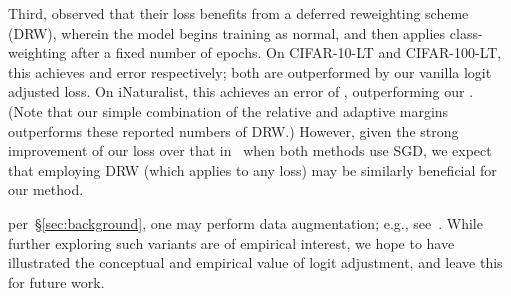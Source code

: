 {{Third,}
\citet{Cao:2019} observed that their loss benefits from a deferred reweighting scheme (DRW), wherein the model 
begins training
as normal,
and then
applies class-weighting
after a fixed number of epochs.
On CIFAR-10-LT and CIFAR-100-LT,
this 
achieves  and 
error respectively;
both are outperformed by
our vanilla logit adjusted loss.
On iNaturalist, 
this
achieves an error of , outperforming our .
{(Note that our simple combination of the relative and adaptive margins outperforms these reported numbers of DRW.)
However, given the strong improvement of our loss over that in~\citet{Cao:2019} when both methods use SGD,
we expect that employing DRW 
(which applies to any loss)
may be similarly beneficial for our method.}

 per~\S\ref{sec:background}, one may perform data augmentation;
e.g., see~\citet[Section 6]{Tan:2020}.
While further exploring such variants are of empirical interest,
we hope to have illustrated the conceptual and empirical value of logit adjustment,
and leave this for future work.
}
